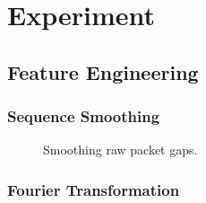 \section{Experiment}
\label{sec:experiment}

\subsection{Feature Engineering}
\label{sub:feature_engineering}

\subsubsection{Sequence Smoothing}
\label{ssub:sequence_smoothing}

\begin{figure}[htpb]
   \centering
   \quad
   \caption{Smoothing raw packet gaps.}
   \label{fig:smoothing}
\end{figure}

\subsubsection{Fourier Transformation}
\label{ssub:fourier_transformation}


